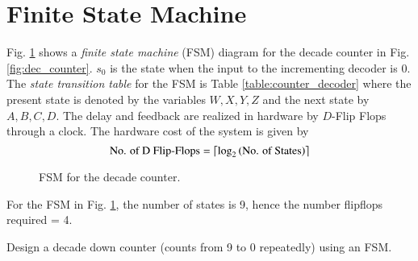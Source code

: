\documentclass[journal,12pt,twocolumn]{IEEEtran}
\begin{document}
\section{Finite State Machine}
%
Fig. \ref{fig:fsm_counter} shows a {\em finite state machine} (FSM) diagram for the decade counter in Fig. \ref{fig:dec_counter}.  $s_0$ is the state when the input to the incrementing decoder is 0.  The {\em state transition table} for the FSM is Table \ref{table:counter_decoder} where the present state is denoted by the variables $W,X,Y,Z$ and the next state by $A,B,C,D$.  The delay and feedback are realized in hardware by $D$-Flip Flops through a clock.  The hardware cost of the system is given by
\begin{equation}
\text{No. of D Flip-Flops} = \left \lceil \log_{2}\left(\text{No. of States}\right) \right \rceil
\end{equation}
\begin{figure}[!h]

\caption{FSM for the decade counter.}
\label{fig:fsm_counter}
\end{figure}
For the FSM in Fig. \ref{fig:fsm_counter}, the number of states is 9, hence the number flipflops required = 4.
\begin{problem}
Design a decade down counter (counts from 9 to 0 repeatedly) using an FSM.  
\end{problem}
%
%

%
%
%
%
%
%
%
\end{document}

